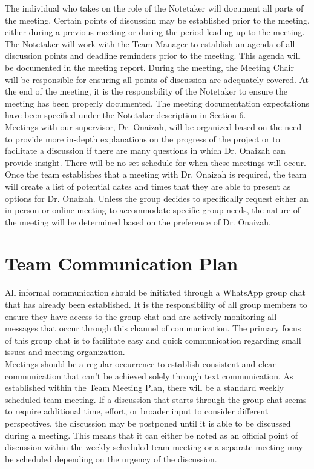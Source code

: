 \documentclass{article}
\begin{document}
The individual who takes on the role of the Notetaker will document all parts of the meeting. Certain points of
discussion may be established prior to the meeting, either during a previous meeting or during the period leading
up to the meeting. The Notetaker will work with the Team Manager to establish an agenda of all discussion points
and deadline reminders prior to the meeting. This agenda will be documented in the meeting report. During the
meeting, the Meeting Chair will be responsible for ensuring all points of discussion are adequately covered. At the
end of the meeting, it is the responsbility of the Notetaker to ensure the meeting has been properly documented.
The meeting documentation expectations have been specified under the Notetaker description in Section 6.\\

Meetings with our supervisor, Dr. Onaizah, will be organized based on the need to provide more in-depth explanations
on the progress of the project or to facilitate a discussion if there are many questions in which Dr. Onaizah can
provide insight. There will be no set schedule for when these meetings will occur. Once the team establishes that a
meeting with Dr. Onaizah is required, the team will create a list of potential dates and times that they are able
to present as options for Dr. Onaizah. Unless the group decides to specifically request either an in-person or
online meeting to accommodate specific group needs, the nature of the meeting will be determined based on the
preference of Dr. Onaizah.

\section{Team Communication Plan}

\iffalse
\wss{Issues on GitHub should be part of your communication plan.}
\fi

All informal communication should be initiated through a WhatsApp group chat that has already been established. It
is the responsibility of all group members to ensure they have access to the group chat and are actively monitoring
all messages that occur through this channel of communication. The primary focus of this group chat is to facilitate
easy and quick communication regarding small issues and meeting organization.\\

Meetings should be a regular occurrence to establish consistent and clear communication that can’t be achieved
solely through text communication. As established within the Team Meeting Plan, there will be a standard weekly scheduled
team meeting. If a discussion that starts through the group chat seems to require additional time, effort, or
broader input to consider different perspectives, the discussion may be postponed until it is able to be discussed
during a meeting. This means that it can either be noted as an official point of discussion within the weekly
scheduled team meeting or a separate meeting may be scheduled depending on the urgency of the discussion.\\
\end{document}
